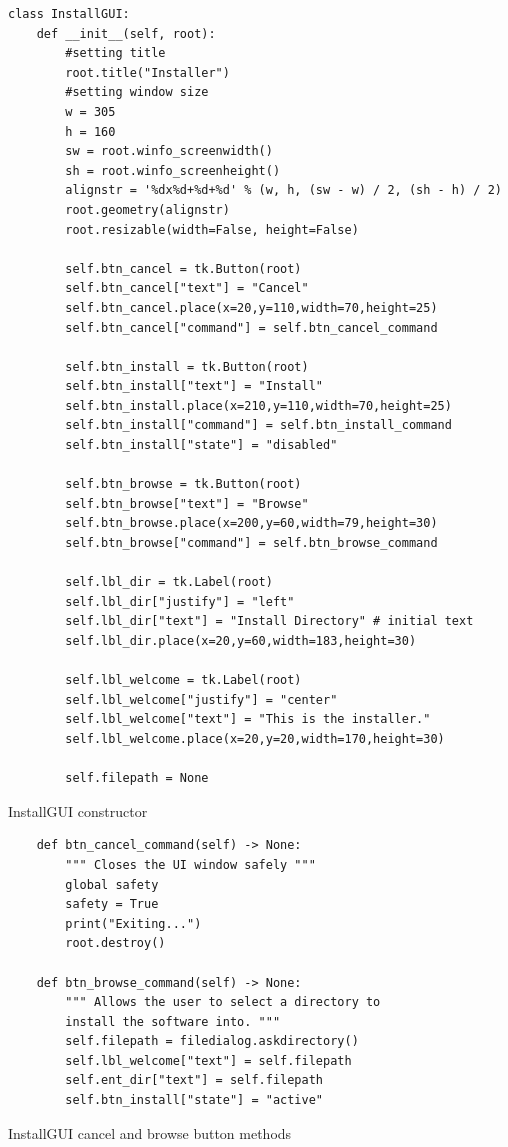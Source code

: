 \documentclass[11pt]{article}
\begin{document}
        \newpage
        \begin{listing}[!ht]
            \begin{verbatim}
class InstallGUI:
    def __init__(self, root):
        #setting title
        root.title("Installer")
        #setting window size
        w = 305
        h = 160
        sw = root.winfo_screenwidth()
        sh = root.winfo_screenheight()
        alignstr = '%dx%d+%d+%d' % (w, h, (sw - w) / 2, (sh - h) / 2)
        root.geometry(alignstr)
        root.resizable(width=False, height=False)

        self.btn_cancel = tk.Button(root)
        self.btn_cancel["text"] = "Cancel"
        self.btn_cancel.place(x=20,y=110,width=70,height=25)
        self.btn_cancel["command"] = self.btn_cancel_command

        self.btn_install = tk.Button(root)
        self.btn_install["text"] = "Install"
        self.btn_install.place(x=210,y=110,width=70,height=25)
        self.btn_install["command"] = self.btn_install_command
        self.btn_install["state"] = "disabled"

        self.btn_browse = tk.Button(root)
        self.btn_browse["text"] = "Browse"
        self.btn_browse.place(x=200,y=60,width=79,height=30)
        self.btn_browse["command"] = self.btn_browse_command

        self.lbl_dir = tk.Label(root)
        self.lbl_dir["justify"] = "left"
        self.lbl_dir["text"] = "Install Directory" # initial text
        self.lbl_dir.place(x=20,y=60,width=183,height=30)

        self.lbl_welcome = tk.Label(root)
        self.lbl_welcome["justify"] = "center"
        self.lbl_welcome["text"] = "This is the installer."
        self.lbl_welcome.place(x=20,y=20,width=170,height=30)
        
        self.filepath = None
            \end{verbatim}
            \caption{InstallGUI constructor}
            \label{sc:install_gui_init_sc_c1}
        \end{listing}


        \newpage
        \begin{listing}[!ht]
            \begin{verbatim}
    def btn_cancel_command(self) -> None:
        """ Closes the UI window safely """
        global safety
        safety = True
        print("Exiting...")
        root.destroy()

    def btn_browse_command(self) -> None:
        """ Allows the user to select a directory to 
        install the software into. """
        self.filepath = filedialog.askdirectory()
        self.lbl_welcome["text"] = self.filepath
        self.ent_dir["text"] = self.filepath
        self.btn_install["state"] = "active"
            \end{verbatim}
            \caption{InstallGUI cancel and browse button methods}
            \label{sc:cancel_and_browse_btns_sc_c1}
        \end{listing}
\end{document}

